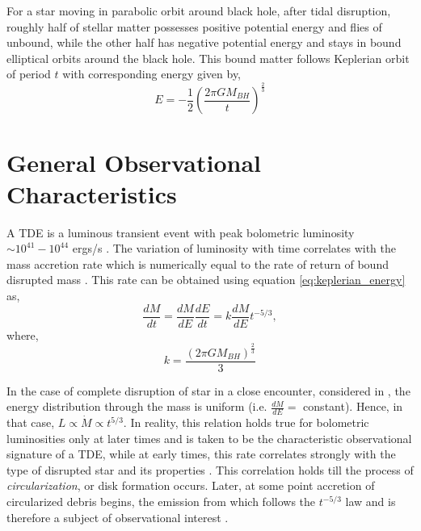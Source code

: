 \documentclass{tda}
\begin{document}
For a star moving in parabolic orbit around black hole, after tidal disruption, roughly half of stellar matter possesses positive potential energy and flies of unbound, while the other half has negative potential energy and stays in bound elliptical orbits around the black hole. This bound matter follows Keplerian orbit of period \(t\) with corresponding energy given by,
\begin{equation}
	E = -\frac{1}{2} \left( \frac{2 \pi G M_{BH}}{t} \right)^\frac{2}{3}
	\label{eq:keplerian_energy}
\end{equation}




\section{General Observational Characteristics}

A TDE is a luminous transient event with peak bolometric luminosity \(\sim 10^{41} - 10^{44}\) ergs/s \cite{lodato_multiband_2011, bonnerot_simulating_2020}. The variation of luminosity with time correlates with the mass accretion rate which is numerically equal to the rate of return of bound disrupted mass \cite{phinney_manifestations_1989}. This rate can be obtained using equation \ref{eq:keplerian_energy} as,
\begin{equation}
	\frac{dM}{dt} = \frac{dM}{dE} \frac{dE}{dt} = k \frac{dM}{dE} t^{-5/3},
	\label{eq:tde_luminosity_time}
\end{equation}
where, \[k=\frac{\left({2 \pi G M_{BH}}\right)^{\frac{2}{3}}}{3}\]

\noindent In the case of complete disruption of star in a close encounter, considered in \cite{evans_tidal_1989, lodato_stellar_2009}, the energy distribution through the mass is uniform (i.e. \(\frac{dM}{dE} = \) constant). Hence, in that case, \(L \propto \dot{M} \propto t^{5/3}\). In reality, this relation holds true for bolometric luminosities only at later times \cite{lodato_stellar_2009, lodato_multiband_2011} and is taken to be the characteristic observational signature of a TDE, while at early times, this rate correlates strongly with the type of disrupted star and its properties \cite{lodato_stellar_2009, lodato_recent_2015, guillochon_hydrodynamical_2013}. This correlation holds till the process of \emph{circularization}, or disk formation occurs. Later, at some point accretion of circularized debris begins, the emission from which follows the \(t^{-5/3}\) law and is therefore a subject of observational interest \cite{piran_disk_2015}.
\end{document}
